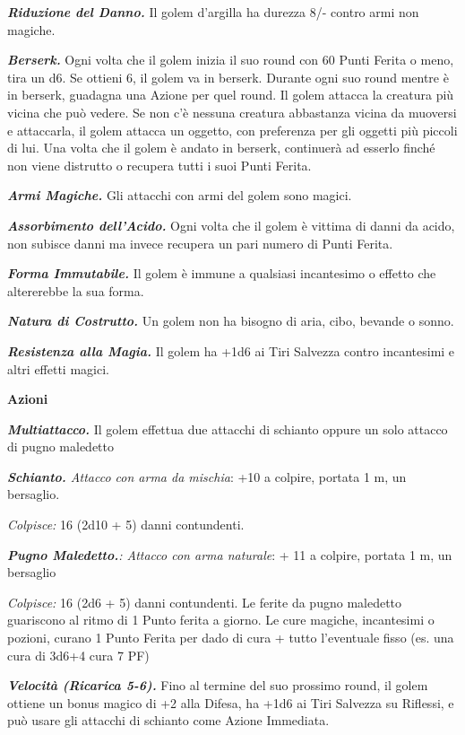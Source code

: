 \begin{multicols}{2}
{\emph{\textbf{Riduzione del Danno.}} Il golem d'argilla ha durezza 8/- contro armi non magiche.

\emph{\textbf{Berserk.}} Ogni volta che il golem inizia il suo round con 60 Punti Ferita o meno, tira un d6. Se ottieni 6, il golem va in berserk. Durante ogni suo round mentre è in berserk, guadagna una Azione per quel round. Il golem attacca la creatura più vicina che può vedere. Se non c'è nessuna creatura abbastanza vicina da muoversi e attaccarla, il golem attacca un oggetto, con preferenza per gli oggetti più piccoli di lui. Una volta che il golem è andato in berserk, continuerà ad esserlo finché non viene distrutto o recupera tutti i suoi Punti Ferita.

\emph{\textbf{Armi Magiche.}} Gli attacchi con armi del golem sono magici.

\emph{\textbf{Assorbimento dell'Acido.}} Ogni volta che il golem è vittima di danni da acido, non subisce danni ma invece recupera un pari numero di Punti Ferita.

\emph{\textbf{Forma Immutabile.}} Il golem è immune a qualsiasi incantesimo o effetto che altererebbe la sua forma.

\emph{\textbf{Natura di Costrutto.}} Un golem non ha bisogno di aria, cibo, bevande o sonno.

\emph{\textbf{Resistenza alla Magia.}} Il golem ha +1d6 ai Tiri Salvezza contro incantesimi e altri effetti magici.

\textbf{Azioni}

\emph{\textbf{Multiattacco.}} Il golem effettua due attacchi di schianto oppure un solo attacco di pugno maledetto

\emph{\textbf{Schianto.} Attacco con arma da mischia}: +10 a colpire, portata 1 m, un bersaglio.

\emph{Colpisce:} 16 (2d10 + 5) danni contundenti.

\emph{\textbf{Pugno Maledetto.}: Attacco con arma naturale}: + 11 a colpire, portata 1 m, un bersaglio

\emph{Colpisce:} 16 (2d6 + 5) danni contundenti. Le ferite da pugno maledetto guariscono al ritmo di 1 Punto ferita a giorno. Le cure magiche, incantesimi o pozioni, curano 1 Punto Ferita per dado di cura + tutto l'eventuale fisso (es. una cura di 3d6+4 cura 7 PF)

\emph{\textbf{Velocità (Ricarica 5-6).}} Fino al termine del suo prossimo round, il golem ottiene un bonus magico di +2 alla Difesa, ha +1d6 ai Tiri Salvezza su Riflessi, e può usare gli attacchi di schianto come Azione Immediata.

}
\end{multicols}
